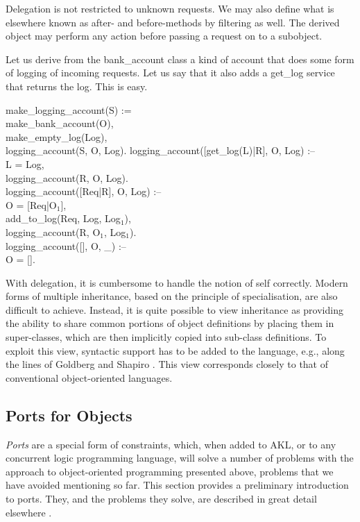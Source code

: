 Delegation is not restricted to unknown requests.  We may also define
what is elsewhere known as after- and before-methods by filtering as
well.  The derived object may perform any action before passing a
request on to a subobject.

Let us derive from the {\prog bank_account} class a kind of account
that does some form of logging of incoming requests.  Let us say that
it also adds a {\prog get_log} service that returns the log.  This is
easy.
%
\begin{program}
make_logging_account(S) := \\
\>\>	make_bank_account(O), \\
\>\>	make_empty_log(Log), \\
\>\>	logging_account(S, O, Log).  \nl
logging_account([get_log(L)|R], O, Log) :-- \\
\>\cond\>	L = Log, \\
\>\>	logging_account(R, O, Log).  \\
logging_account([Req|R], O, Log) :-- \\
\>\cond\>	O = [Req|O$_1$], \\
\>\>	add_to_log(Req, Log, Log$_1$), \\
\>\>	logging_account(R, O$_1$, Log$_1$).  \\
logging_account([], O, _) :-- \\
\>\cond\>	O = [].
\end{program}%
%
With delegation, it is cumbersome to handle the notion of self
correctly.  Modern forms of multiple inheritance, based on the
principle of specialisation, are also difficult to achieve.  Instead,
it is quite possible to view inheritance as providing the ability to
share common portions of object definitions by placing them in
super-classes, which are then implicitly copied into sub-class
definitions.  To exploit this view, syntactic support has to be added
to the language, e.g., along the lines of Goldberg and Shapiro
\cite{sha92}.  This view corresponds closely to that of conventional
object-oriented languages.

\subsection{Ports for Objects}

{\em Ports} are a special form of constraints, which, when added to
AKL, or to any concurrent logic programming language, will solve a
number of problems with the approach to object-oriented programming
presented above, problems that we have avoided mentioning so far.
This section provides a preliminary introduction to ports.  They, and
the problems they solve, are described in great detail elsewhere
\cite{jamoha93}.

